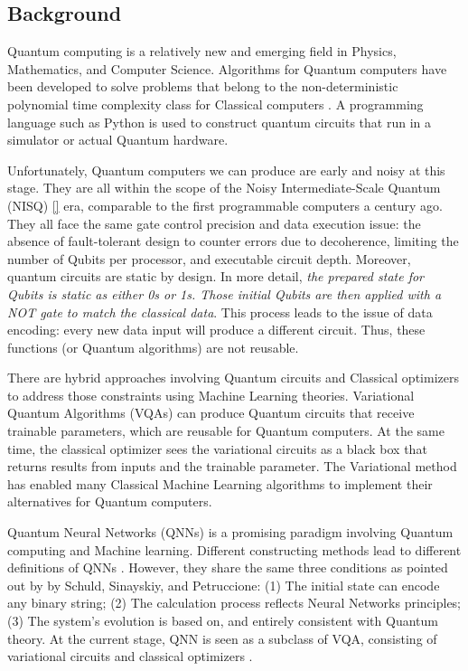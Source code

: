 \subsection{Background}\label{Background Section}
Quantum computing is a relatively new and emerging field in Physics, Mathematics, and Computer Science. 
Algorithms for Quantum computers have been developed to solve problems that belong to the non-deterministic polynomial time complexity class for Classical computers \cite{williamsSolvingNPCompleteProblems2011,jiangQuantumAnnealingPrime2018,farhiQuantumApproximateOptimization2014}. 
A programming language such as Python is used to construct quantum circuits that run in a simulator or actual Quantum hardware. 

Unfortunately, Quantum computers we can produce are early and noisy at this stage. 
They are all within the scope of the Noisy Intermediate-Scale Quantum (NISQ) \ref{} era, comparable to the first programmable computers a century ago. 
They all face the same gate control precision and data execution issue: the absence of fault-tolerant design to counter errors due to decoherence, limiting the number of Qubits per processor, and executable circuit depth. 
Moreover, quantum circuits are static by design. In more detail, \emph{the prepared state for Qubits is static as either 0s or 1s. 
Those initial Qubits are then applied with a NOT gate to match the classical data}. This process leads to the issue of data encoding: every new data input will produce a different circuit. 
Thus, these functions (or Quantum algorithms) are not reusable.

There are hybrid approaches involving Quantum circuits and Classical optimizers to address those constraints using Machine Learning theories. 
Variational Quantum Algorithms (VQAs) \cite{cerezo2021variational} can produce Quantum circuits that receive trainable parameters, which are reusable for Quantum computers. 
At the same time, the classical optimizer sees the variational circuits as a black box that returns results from inputs and the trainable parameter. 
The Variational method has enabled many Classical Machine Learning algorithms to implement their alternatives for Quantum computers.

Quantum Neural Networks (QNNs) \cite{altaisky2001quantum} is a promising paradigm involving Quantum computing and Machine learning. 
Different constructing methods lead to different definitions of QNNs \cite{paetznick2013} \cite{zhaoBuildingQuantumNeural2019} \cite{caoQuantumNeuronElementary2017}. 
However, they share the same three conditions as pointed out by \cite{schuldQuestQuantumNeural2014} by Schuld, Sinayskiy, and Petruccione: 
(1) The initial state can encode any binary string;
(2) The calculation process reflects Neural Networks principles;
(3) The system's evolution is based on, and entirely consistent with Quantum theory.
At the current stage, QNN is seen as a subclass of VQA, consisting of variational circuits and classical optimizers \cite{abbasPowerQuantumNeural2021}.

